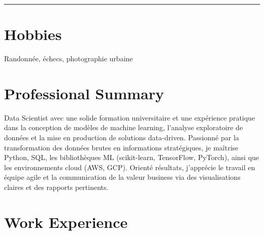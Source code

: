 \documentclass[10pt,letterpaper]{article}
\newcommand{\cvHr}{\vspace{0.5\baselineskip}\hrule height 1pt\color{primary}\vspace{0.7\baselineskip}}
\begin{document}
\begin{paracol}{2}
\begin{leftcolumn}
\cvHr

\section*{Hobbies}
Randonnée, échecs, photographie urbaine

\end{leftcolumn}

\begin{rightcolumn}

\section*{Professional Summary}
Data Scientist avec une solide formation universitaire et une expérience pratique dans la conception de modèles de machine learning, l’analyse exploratoire de données et la mise en production de solutions data-driven. Passionné par la transformation des données brutes en informations stratégiques, je maîtrise Python, SQL, les bibliothèques ML (scikit-learn, TensorFlow, PyTorch), ainsi que les environnements cloud (AWS, GCP). Orienté résultats, j’apprécie le travail en équipe agile et la communication de la valeur business via des visualisations claires et des rapports pertinents.

\vspace{1in}

\section*{Work Experience}


\end{rightcolumn}
\end{paracol}
\end{document}
